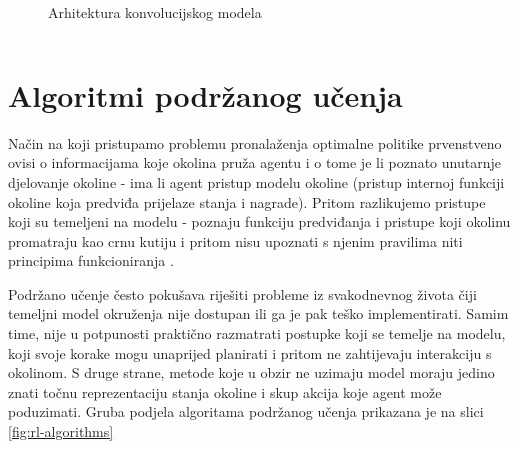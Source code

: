\begin{figure}[H]
    \centering
    \caption{Arhitektura konvolucijskog modela}
    \label{fig:cnn}
\end{figure}

\begin{listing}[H]
    \caption{Implementacija konvolucijskog modela na slici \ref{fig:cnn} koristeći biblioteku \textit{PyTorch}}
    \inputminted{python}{snippets/cnn.py}
    \label{lst:cnn}
\end{listing}

\section{Algoritmi podržanog učenja}

Način na koji pristupamo problemu pronalaženja optimalne politike prvenstveno ovisi o informacijama koje okolina pruža agentu i o tome je li poznato unutarnje djelovanje okoline - ima li agent pristup modelu okoline (pristup internoj funkciji okoline koja predviđa prijelaze stanja i nagrade). Pritom razlikujemo pristupe koji su temeljeni na modelu - poznaju funkciju predviđanja  i pristupe koji okolinu promatraju kao crnu kutiju i pritom nisu upoznati s njenim pravilima niti principima funkcioniranja .

Podržano učenje često pokušava riješiti probleme iz svakodnevnog života čiji temeljni model okruženja nije dostupan ili ga je pak teško implementirati. Samim time, nije u potpunosti praktično razmatrati postupke koji se temelje na modelu, koji svoje korake mogu unaprijed planirati i pritom ne zahtijevaju interakciju s okolinom. S druge strane, metode koje u obzir ne uzimaju model moraju jedino znati točnu reprezentaciju stanja okoline i skup akcija koje agent može poduzimati. Gruba podjela algoritama podržanog učenja prikazana je na slici \ref{fig:rl-algorithms}

